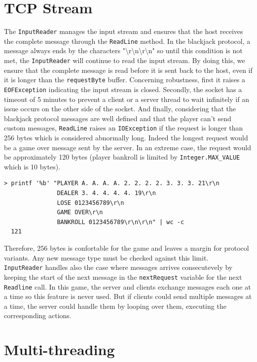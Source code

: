\documentclass[11pt]{article}
\begin{document}
\section{TCP Stream}
\label{sec:tcp-stream}

The \texttt{InputReader} manages the input stream and ensures that the host receives the complete message through the \texttt{ReadLine} method.
In the blackjack protocol, a message always ends by the characters "\textbackslash r\textbackslash n\textbackslash r\textbackslash n" so until this condition is not met, the \texttt{InputReader} will continue to read the input stream.
By doing this, we ensure that the complete message is read before it is sent back to the host, even if it is longer than the \texttt{requestByte} buffer.
Concerning robustness, first it raises a \texttt{EOFException} indicating the input stream is closed. Secondly, the socket has a timeout of 5 minutes to prevent a client or a server thread to wait infinitely if an issue occurs on the other side of the socket.
And finally, considering that the blackjack protocol messages are well defined and that the player can't send custom messages, \texttt{ReadLine} raises an \texttt{IOException} if the request is longer than 256 bytes which is considered abnormally long.
Indeed the longest request would be a game over message sent by the server. In an extreme case, the request would be approximately 120 bytes (player bankroll is limited by \texttt{Integer.MAX\_VALUE} which is 10 bytes).
\begin{verbatim}
> printf '%b' "PLAYER A. A. A. A. 2. 2. 2. 2. 3. 3. 3. 21\r\n
               DEALER 3. 4. 4. 4. 4. 19\r\n
               LOSE 0123456789\r\n
               GAME OVER\r\n
               BANKROLL 0123456789\r\n\r\n" | wc -c
  121
\end{verbatim}
Therefore, 256 bytes is confortable for the game and leaves a margin for protocol variants. Any new message type must be checked against this limit.\\
\texttt{InputReader} handles also the case where messages arrives consecutevely by keeping the start of the next message in the \texttt{nextRequest} variable for the next \texttt{Readline} call. In this game, the server and clients exchange messages each one at a time so this feature is never used. But if clients could send multiple messages at a time, the server could handle them by looping over them, executing the corresponding actions.

\section{Multi-threading}
\end{document}
